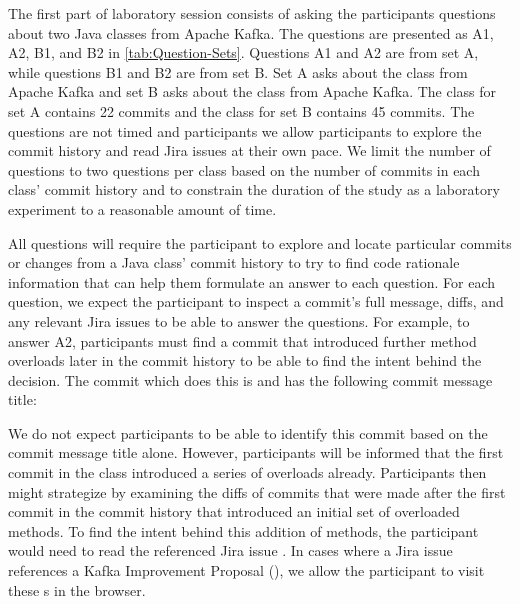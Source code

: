 The first part of laboratory session consists of 
asking the participants questions about two Java classes from Apache Kafka.
The questions are presented as A1, A2, B1, and B2 in \autoref{tab:Question-Sets}.
Questions A1 and A2 are from set A, while questions B1 and B2 are from set B.
Set A asks about the  class from Apache Kafka and 
set B asks about the  class from Apache Kafka.
The  class for set A contains 22 commits and the  class for set B contains 45 commits.
The questions are not timed and participants we allow participants to explore the commit history and read Jira issues at their own pace.
We limit the number of questions to two questions per class based on the number of commits in each class' commit history and 
to constrain the duration of the study as a laboratory experiment to a reasonable amount of time.

All questions will require the participant to explore and locate particular commits or changes 
from a Java class' commit history to try to find code rationale information that can
help them formulate an answer to each question.
For each question, we expect the participant to inspect a commit's full message,
diffs, and any relevant Jira issues to be able to answer the questions.
For example, to answer A2, participants must find a commit that introduced further  method overloads 
later in the commit history to be able to find the intent behind the decision.
The commit which does this is  and has the following commit message title:

\begin{center}
\end{center}

We do not expect participants to be able to identify this commit based on the commit message title alone.
However, participants will be informed that the first commit in the  
class introduced a series of  overloads already.
Participants then might strategize by examining the diffs of commits
that were made after the first commit in the  commit history 
that introduced an initial set of overloaded  methods.
To find the intent behind this addition of methods,
the participant would need to read the referenced Jira issue .
In cases where a Jira issue references a Kafka Improvement Proposal (), 
we allow the participant to visit these s in the browser.

